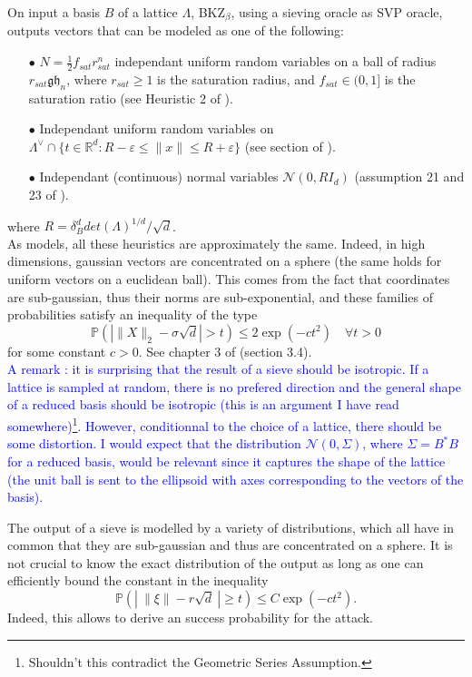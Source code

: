 \documentclass{article}
\newif\ifshowcomments
\DeclareRobustCommand{\TN}[1]{%
  \ifshowcomments
    {\color{orange} [TN][#1]}%
  \fi
}
\begin{document}
On input a basis $B$ of a lattice $\Lambda$, BKZ$_\beta$, using a sieving oracle as SVP oracle, outputs vectors that can be modeled as one of the following: \TN{$\beta$ n'intervient pas dans les caractérisations suivantes ?}
\begin{itemize}
\item[$\bullet$] $N = \frac{1}{2}f_{sat}r_{sat}^n$ independant uniform random variables on a ball of radius $r_{sat} \mathfrak{gh}_n$, where $r_{sat}\geq 1$ is the saturation radius, and $f_{sat}\in (0,1]$ is the saturation ratio (see Heuristic 2 of \cite{ducas2023accurate}).
\item[$\bullet$] Independant uniform random variables on $\Lambda^\vee \cap \{t\in \mathbb R^d : R-\varepsilon\leq \|x\| \leq R+\varepsilon\}$ (see section of \cite{carrier2024reduction}). 
\item[$\bullet$] Independant (continuous) normal variables $\mathcal N(0,R I_d)$ (assumption 21 and 23 of \cite{espitau2020dual}). 
\end{itemize}
where $R = \delta_B^d det(\Lambda)^{1/d} / \sqrt{d}$. \\

As models, all these heuristics are approximately the same. Indeed, in high dimensions, gaussian vectors are concentrated on a sphere (the same holds for uniform vectors on a euclidean ball). This comes from the fact that coordinates are sub-gaussian, thus their norms are sub-exponential, and these families of probabilities satisfy an inequality of the type 
\[\mathbb P(| \|X\|_2 - \sigma \sqrt{d} |> t  ) \leq 2\exp(-ct^2)\quad \forall t>0\]
for some constant $c>0$. See chapter 3 of \cite{vershynin2018high} (section 3.4). \\
   
\textcolor{blue}{A remark : it is surprising that the result of a sieve should be isotropic. If a lattice is sampled at random, there is no prefered direction and the general shape of a reduced basis should be isotropic (this is an argument I have read somewhere)\footnote{Shouldn't this contradict the Geometric Series Assumption.}. However, conditionnal to the choice of a lattice, there should be some distortion. I would expect that the distribution $\mathcal N(0,\Sigma)$, where $\Sigma = B^*B$ for a reduced basis, would be relevant since it captures the shape of the lattice (the unit ball is sent to the ellipsoid with axes corresponding to the vectors of the basis). }

The output of a sieve is modelled by a variety of distributions, which all have in common that they are sub-gaussian and thus are concentrated on a sphere. It is not crucial to know the exact distribution of the output as long as one can efficiently bound the constant in the inequality
\[\mathbb P(| \ \|\xi\| - r\sqrt{d} \ | \geq t) \leq C\exp(-ct^2).\]
Indeed, this allows to derive an success probability for the attack. 
\end{document}
